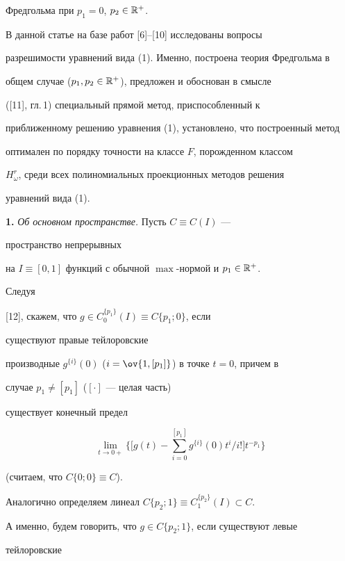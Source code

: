 Фредгольма при $p_1=0$, $p_2\in\Bbb R^+$. 


 


В данной статье на базе работ [6]--[10] исследованы вопросы 


разрешимости уравнений вида (1). Именно, построена теория Фредгольма в 


общем случае ($p_1,p_2\in\Bbb R^+$), предложен и обоснован в смысле 


([11], гл.\,1) специальный прямой метод, приспособленный к 


приближенному решению уравнения (1), установлено, что построенный метод 


оптимален по порядку точности на классе $F$, порожденном классом 


$H^r_\omega$, среди всех полиномиальных проекционных методов решения 


уравнений вида (1). 


\medskip 


 


{\bf 1.} {\it Об основном пространстве.} Пусть $C\equiv C(I)$ --- 


пространство непрерывных 


на $I\equiv[0,1]$ функций с обычной $\max$-нормой и $p_1\in\Bbb R^+$. 


Следуя 


[12], скажем, что $g\in C^{\{p_1\}}_0(I)\equiv C\{p_1;0\}$, если 


существуют правые тейлоровские 


производные $g^{\{i\}}(0)$ ($i=\ov{1,[p_1]}$) в точке $t=0$, причем в 


случае $p_1\ne[p_1]$ ($[\cdot]$ --- целая часть) 


существует конечный предел 


$$ 


\lim_{t\to 0+}\bigg\{\bigg[ g(t)-\sum^{[p_1]}_{i=0} 


g^{\{i\}}(0)t^i/i!\bigg]t^{-p_1}\bigg\} 


$$ 


(считаем, что $C\{0;0\}\equiv C$). 


 


Аналогично определяем линеал $C\{p_2;1\}\equiv C^{\{p_2\}}_1(I)\subset C$. 


А именно, будем говорить, что $g\in C\{p_2;1\}$, если существуют левые 


тейлоровские 


